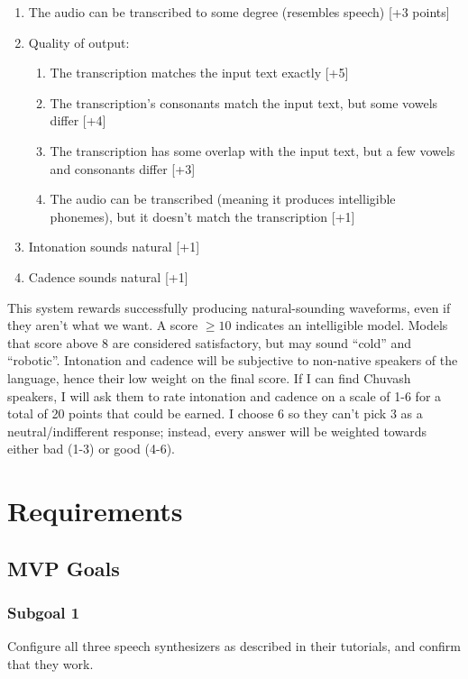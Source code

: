 \documentclass[fleqn,10pt]{SelfArx} %
\begin{document}
\begin{enumerate}
	\item The audio can be transcribed to some degree (resembles speech) [+3 points]
	\item Quality of output:
	\begin{enumerate}
		\item The transcription matches the input text exactly [+5]
		\item The transcription's consonants match the input text, but some vowels differ [+4]
		\item The transcription has some overlap with the input text, but a few vowels and consonants differ [+3]
		\item The audio can be transcribed (meaning it produces intelligible phonemes), but it doesn't match the transcription [+1]
	\end{enumerate}
	\item Intonation sounds natural [+1]
	\item Cadence sounds natural [+1]
\end{enumerate}

This system rewards successfully producing natural-sounding waveforms, even if they aren't what we want. A score $\geq10$ indicates an intelligible model. Models that score above 8 are considered satisfactory, but may sound ``cold'' and ``robotic''. Intonation and cadence will be subjective to non-native speakers of the language, hence their low weight on the final score. If I can find Chuvash speakers, I will ask them to rate intonation and cadence on a scale of 1-6 for a total of 20 points that could be earned. I choose 6 so they can't pick 3 as a neutral/indifferent response; instead, every answer will be weighted towards either bad (1-3) or good (4-6).

\section{Requirements}
\subsection{MVP Goals}
\subsubsection{Subgoal 1}
Configure all three speech synthesizers as described in their tutorials, and confirm that they work.
\end{document}

